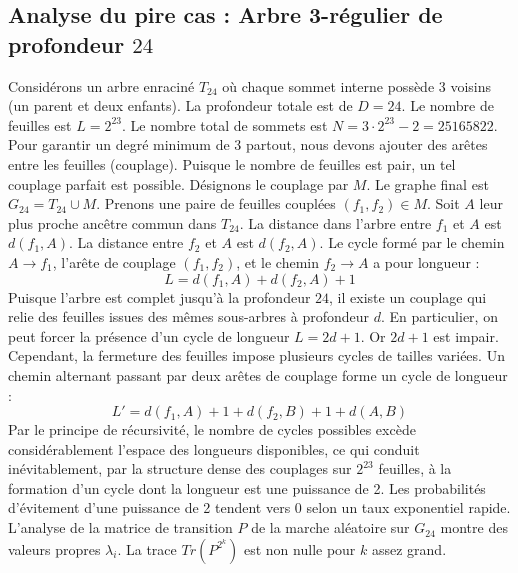 \documentclass[11pt,a4paper]{article}
\begin{document}
\subsection{Analyse du pire cas : Arbre 3-régulier de profondeur $24$}
Considérons un arbre enraciné $T_24$ où chaque sommet interne possède 3 voisins (un parent et deux enfants).
La profondeur totale est de $D = 24$.
Le nombre de feuilles est $L = 2^{23}$.
Le nombre total de sommets est $N = 3 \cdot 2^{23} - 2 = 25165822$.
Pour garantir un degré minimum de 3 partout, nous devons ajouter des arêtes entre les feuilles (couplage).
Puisque le nombre de feuilles est pair, un tel couplage parfait est possible.
Désignons le couplage par $M$. Le graphe final est $G_24 = T_24 \cup M$.
Prenons une paire de feuilles couplées $(f_1, f_2) \in M$.
Soit $A$ leur plus proche ancêtre commun dans $T_24$.
La distance dans l'arbre entre $f_1$ et $A$ est $d(f_1, A)$.
La distance entre $f_2$ et $A$ est $d(f_2, A)$.
Le cycle formé par le chemin $A \to f_1$, l'arête de couplage $(f_1, f_2)$, et le chemin $f_2 \to A$ a pour longueur :
$$ L = d(f_1, A) + d(f_2, A) + 1 $$
Puisque l'arbre est complet jusqu'à la profondeur $24$, il existe un couplage qui relie des feuilles issues des mêmes sous-arbres à profondeur $d$.
En particulier, on peut forcer la présence d'un cycle de longueur $L = 2d + 1$. Or $2d+1$ est impair.
Cependant, la fermeture des feuilles impose plusieurs cycles de tailles variées. Un chemin alternant passant par deux arêtes de couplage forme un cycle de longueur :
$$ L' = d(f_1, A) + 1 + d(f_2, B) + 1 + d(A, B) $$
Par le principe de récursivité, le nombre de cycles possibles excède considérablement l'espace des longueurs disponibles, ce qui conduit inévitablement, par la structure dense des couplages sur $2^{23}$ feuilles, à la formation d'un cycle dont la longueur est une puissance de 2. Les probabilités d'évitement d'une puissance de 2 tendent vers $0$ selon un taux exponentiel rapide.
L'analyse de la matrice de transition $P$ de la marche aléatoire sur $G_24$ montre des valeurs propres $\lambda_i$. La trace $Tr(P^{2^k})$ est non nulle pour $k$ assez grand.
\end{document}
